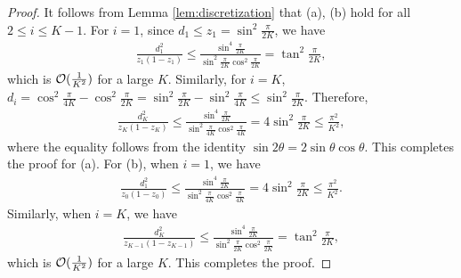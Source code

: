 \begin{proof}
     It follows from Lemma \ref{lem:discretization} that (a), (b) hold for all $2 \le i \le K - 1$. For $i = 1$, since $d_{1} \le z_{1} = \sin ^ {2} \frac{\pi}{2K}$, we have \begin{align*}
         \frac{d_{1} ^ {2}}{z_{1}(1 - z_{1})} \le \frac{\sin ^ {4} \frac{\pi}{2K}}{\sin ^ {2} \frac{\pi}{2K} \cos ^ {2} \frac{\pi}{2K}} = \tan ^ {2} \frac{\pi}{2K},
     \end{align*}
     which is $\mathcal{O}(\frac{1}{K ^ {2}})$ for a large $K$. Similarly, for $i = K$, $d_{i} = \cos ^ {2} \frac{\pi}{4K} - \cos ^ {2} \frac{\pi}{2K} = \sin ^ {2} \frac{\pi}{2K} - \sin ^ {2} \frac{\pi}{4K} \le \sin ^ {2} \frac{\pi}{2K}$. Therefore, \begin{align*}
         \frac{d_{K} ^ {2}}{z_{K}(1 - z_{K})} \le \frac{\sin ^ {4} \frac{\pi}{2K}}{\sin ^ {2} \frac{\pi}{4K} \cos ^ {2} \frac{\pi}{4K}} = 4 \sin ^ {2} \frac{\pi}{2K} \le \frac{\pi ^ {2}}{K ^ {2}},
     \end{align*}
     where the equality follows from the identity $\sin 2\theta = 2 \sin \theta \cos \theta$. This completes the proof for (a). For (b), when $i = 1$, we have \begin{align*}
         \frac{d_{1} ^ {2}}{z_{0}(1 - z_{0})} \le \frac{\sin ^ {4} \frac{\pi}{2K}}{\sin ^ {2} \frac{\pi}{4K} \cos ^ {2} \frac{\pi}{4K}} = 4 \sin ^ {2} \frac{\pi}{2K} \le \frac{\pi ^ {2}}{K ^ {2}}.
     \end{align*} 
     Similarly, when $i = K$, we have \begin{align*}
         \frac{d_{K} ^ {2}}{z_{K - 1}(1 - z_{K - 1})} \le \frac{\sin ^ {4} \frac{\pi}{2K}}{\sin ^ {2} \frac{\pi}{2K} \cos ^ {2} \frac{\pi}{2K}} = \tan ^ {2} \frac{\pi}{2K},
     \end{align*}
     which is $\mathcal{O}(\frac{1}{K ^ {2}})$ for a large $K$. This completes the proof.
\end{proof}

